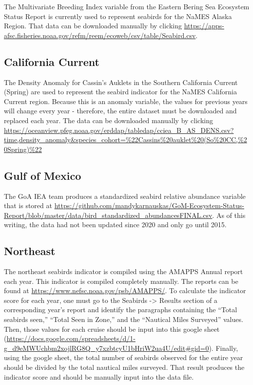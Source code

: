 \documentclass[
]{book}
\begin{document}
The Multivariate Breeding Index variable from the Eastern Bering Sea Ecosystem Status Report is currently used to represent seabirds for the NaMES Alaska Region. That data can be downloaded manually by clicking \url{https://apps-afsc.fisheries.noaa.gov/refm/reem/ecoweb/csv/table/Seabird.csv}.

\hypertarget{california-current-2}{%
\subsection{California Current}\label{california-current-2}}

The Density Anomaly for Cassin's Auklets in the Southern California Current (Spring) are used to represent the seabird indicator for the NaMES California Current region. Because this is an anomaly variable, the values for previous years will change every year - therefore, the entire dataset must be downloaded and replaced each year. The data can be downloaded manually by clicking \url{https://oceanview.pfeg.noaa.gov/erddap/tabledap/cciea_B_AS_DENS.csv?time,density_anomaly\&species_cohort=\%22Cassins\%20auklet\%20(So\%20CC,\%20Spring)\%22}

\hypertarget{gulf-of-mexico-2}{%
\subsection{Gulf of Mexico}\label{gulf-of-mexico-2}}

The GoA IEA team produces a standardized seabird relative abundance variable that is stored at \url{https://github.com/mandykarnauskas/GoM-Ecosystem-Status-Report/blob/master/data/bird_standardized_abundancesFINAL.csv}. As of this writing, the data had not been updated since 2020 and only go until 2015.

\hypertarget{northeast-2}{%
\subsection{Northeast}\label{northeast-2}}

The northeast seabirds indicator is compiled using the AMAPPS Annual report each year. This indicator is compiled completely manually. The reports can be found at \url{https://www.nefsc.noaa.gov/psb/AMAPPS/}. To calculate the indicator score for each year, one must go to the Seabirds -\textgreater{} Results section of a corresponding year's report and identify the paragraphs containing the ``Total seabirds seen,'' ``Total Seen in Zone,'' and the ``Nautical Miles Surveyed'' values. Then, those values for each cruise should be input into this google sheet (\url{https://docs.google.com/spreadsheets/d/1-g_d9eMWUchbm2xojlRG8Q_y7xzbtcyU1bHriW2ua4U/edit\#gid=0}). Finally, using the google sheet, the total number of seabirds observed for the entire year should be divided by the total nautical miles surveyed. That result produces the indicator score and should be manually input into the data file.
\end{document}
